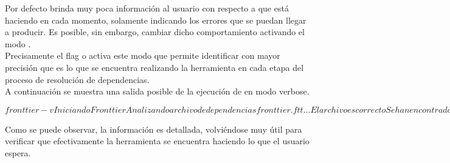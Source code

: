 Por defecto \fronttier brinda muy poca información al usuario con respecto a
que está haciendo en cada momento, solamente indicando los errores
que se puedan llegar a producir. Es posible, sin embargo, cambiar dicho
comportamiento activando el modo .\\
Precisamente el flag  o  activa este modo que permite
identificar con mayor precisión que es lo que se encuentra realizando la
herramienta en cada etapa del proceso de resolución de dependencias.\\
A continuación se muestra una salida posible de la ejecución de \fronttier en modo
verbose.
\begin{consolecode}
	$ fronttier -v
	Iniciando Fronttier
	Analizando archivo de dependencias fronttier.ftt...
	El archivo es correcto
	Se han encontrado los siguientes repositorios declarados:
	https://personal-repository.my-company.com
	Se han encontrado las siguientes dependencias requeridas:
	org.jquery:jquery:2.1.1
	org.jquery:jquery-ui:1.11.0
	com.twitter:bootstrap:3.2.0
	Starting download process
	Checking for org.jquery:jquery:2.1.1 at https://personal-repository.my-company.com
	Downloading at https://personal-repository.my-company.com/org.jquery/jquery/2.1.1/jquery-2.1.1-min.js
	Copying file to global cache at /home/somebody/.ftt/Repository
	Copied at /home/somebody/.ftt/Repository/org.jquery/jquery/2.1.1/jquery-2.1.1-min.js
	Checking for org.jquery:jquery-ui:1.11.0 at https://personal-repository.my-company.com
	Downloading at https://personal-repository.my-company.com/org.jquery/jquery-ui/1.11.0/jquery-ui-1.11.js
	Copying file to global cache at /home/somebody/.ftt/Repository
	Copied at /home/somebody/.ftt/Repository/org.jquery/jquery-ui/1.11.0/jquery-ui-1.11.js
	Checking for com.twitter:bootstrap:3.2.0 at https://personal-repository.my-company.com
	Downloading at https://personal-repository.my-company.com/com.twitter/bootstrap/3.2.0/bootstrap-3.2-min.css
	Downloading at https://personal-repository.my-company.com/com.twitter/bootstrap/3.2.0/bootstrap-3.2-min.js
	Copying file to global cache at /home/somebody/.ftt/Repository
	Copied at /home/somebody/.ftt/Repository/com.twitter/bootstrap/3.2.0/bootstrap-3.2-min.css
	Copied at /home/somebody/.ftt/Repository/com.twitter/bootstrap/3.2.0/bootstrap-3.2-min.js
	Finished downloading process
	Installing dependencies at current project at /home/somebody/projects/myProject
	Installing org.jquery:jquery:2.1.1
	Installing org.jquery:jquery-ui:1.11.0
	Installing com.twitter:bootstrap:3.2.0
	Finished installation.
	Frontiier finished successfuly
	$
\end{consolecode}
Como se puede observar, la información es detallada, volviéndose muy útil para
verificar que efectivamente la herramienta se encuentra haciendo lo que el
usuario espera.

